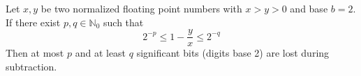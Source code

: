 \begin{theorem}
    Let $x, y$ be two normalized floating point numbers
    with $x > y > 0$ and base $b=2$. If there exist $p, q \in \mathbb{N}_0$ such that
    \[ 2^{-p} \le 1 - \frac{y}{x} \le 2^{-q} \]
    Then at most $p$ and at least $q$ significant bits (digits base 2) are lost during subtraction.
\end{theorem}
